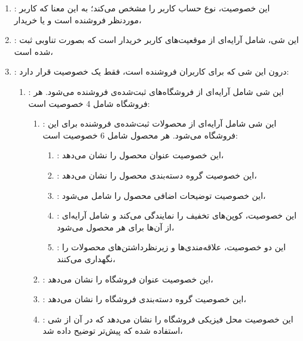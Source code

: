 \begin{enumerate}
	\item {}: این خصوصیت،‌ نوع حساب کاربر را مشخص می‌کند؛ به این معنا که کاربر موردنظر فروشنده است و یا خریدار،
	
	\item {}: این شی، شامل آرایه‌ای از موقعیت‌های کاربر خریدار است که بصورت تناوبی ثبت شده است،
	
	\item {}: درون این شی که برای کاربران فروشنده است، فقط یک خصوصیت قرار دارد:
	\begin{enumerate}
		\item {}: این شی شامل آرایه‌ای از فروشگاه‌های ثبت‌شده‌ی فروشنده می‌شود. هر فروشگاه شامل 4 خصوصیت است:
		\begin{enumerate}[label=\arabic*.]
			\item {}: این شی شامل آرایه‌ای از محصولات ثبت‌شده‌ی فروشنده برای این فروشگاه می‌شود. هر محصول شامل 6 خصوصیت است:
				\begin{enumerate}
					
					\item {}: این خصوصیت عنوان محصول را نشان می‌دهد،
					
					\item {}: این خصوصیت گروه دسته‌بندی محصول را نشان می‌دهد،
					
					\item {}: این خصوصیت توضیحات اضافی محصول را شامل می‌شود،
					
					\item {}: این خصوصیت، کوپن‌های تخفیف را نمایندگی می‌کند و شامل آرایه‌ای از آن‌ها برای هر محصول می‌شود،
					
					\item {}: این دو خصوصیت، علاقه‌مندی‌ها و زیرنظرداشتن‌های محصولات را نگهداری می‌کنند،
					
					
				\end{enumerate}
			
			\item {}: این خصوصیت عنوان فروشگاه را نشان می‌دهد،
			
			\item {}: این خصوصیت گروه دسته‌بندی فروشگاه را نشان می‌دهد،
			
			\item {}: این خصوصیت محل فیزیکی فروشگاه را نشان می‌دهد که در آن از شی  استفاده شده که پیش‌تر توضیح داده شد،
				
		\end{enumerate}
	\end{enumerate}

\end{enumerate}

